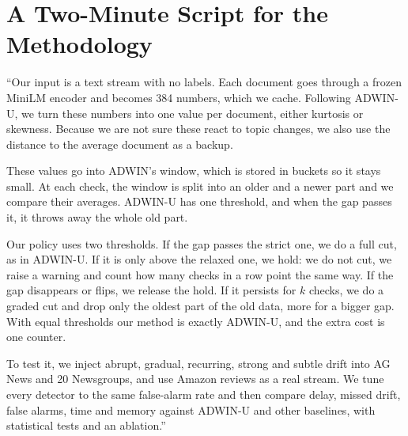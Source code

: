 \documentclass[11pt,a4paper]{article}
\begin{document}
\section{A Two-Minute Script for the Methodology}
\label{sec:script}

\begin{keybox}
``Our input is a text stream with no labels. Each document goes through a frozen MiniLM encoder and becomes 384 numbers, which we cache. Following ADWIN-U, we turn these numbers into one value per document, either kurtosis or skewness. Because we are not sure these react to topic changes, we also use the distance to the average document as a backup.

These values go into ADWIN's window, which is stored in buckets so it stays small. At each check, the window is split into an older and a newer part and we compare their averages. ADWIN-U has one threshold, and when the gap passes it, it throws away the whole old part.

Our policy uses two thresholds. If the gap passes the strict one, we do a full cut, as in ADWIN-U. If it is only above the relaxed one, we hold: we do not cut, we raise a warning and count how many checks in a row point the same way. If the gap disappears or flips, we release the hold. If it persists for $k$ checks, we do a graded cut and drop only the oldest part of the old data, more for a bigger gap. With equal thresholds our method is exactly ADWIN-U, and the extra cost is one counter.

To test it, we inject abrupt, gradual, recurring, strong and subtle drift into AG News and 20 Newsgroups, and use Amazon reviews as a real stream. We tune every detector to the same false-alarm rate and then compare delay, missed drift, false alarms, time and memory against ADWIN-U and other baselines, with statistical tests and an ablation.''
\end{keybox}
\end{document}
